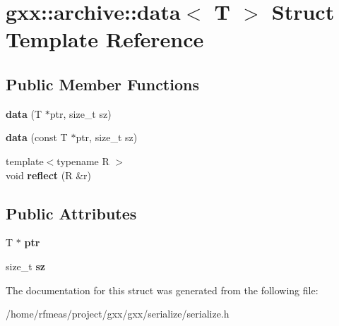 \hypertarget{structgxx_1_1archive_1_1data}{}\section{gxx\+:\+:archive\+:\+:data$<$ T $>$ Struct Template Reference}
\label{structgxx_1_1archive_1_1data}
\subsection*{Public Member Functions}
\begin{DoxyCompactItemize}
\item 
{\bfseries data} (T $\ast$ptr, size\+\_\+t sz)\hypertarget{structgxx_1_1archive_1_1data_a163daa780501b75f52e6176e3d31d91a}{}\label{structgxx_1_1archive_1_1data_a163daa780501b75f52e6176e3d31d91a}

\item 
{\bfseries data} (const T $\ast$ptr, size\+\_\+t sz)\hypertarget{structgxx_1_1archive_1_1data_afadb0f0c4a0cede76489736e64223eef}{}\label{structgxx_1_1archive_1_1data_afadb0f0c4a0cede76489736e64223eef}

\item 
{\footnotesize template$<$typename R $>$ }\\void {\bfseries reflect} (R \&r)\hypertarget{structgxx_1_1archive_1_1data_af2b0ea4292e6402c1cf71a153b4646be}{}\label{structgxx_1_1archive_1_1data_af2b0ea4292e6402c1cf71a153b4646be}

\end{DoxyCompactItemize}
\subsection*{Public Attributes}
\begin{DoxyCompactItemize}
\item 
T $\ast$ {\bfseries ptr}\hypertarget{structgxx_1_1archive_1_1data_a2767f28e6398ed082d401d9fa2cb1c76}{}\label{structgxx_1_1archive_1_1data_a2767f28e6398ed082d401d9fa2cb1c76}

\item 
size\+\_\+t {\bfseries sz}\hypertarget{structgxx_1_1archive_1_1data_a9e39cd96e4cd04ac5228460fa49cb2b5}{}\label{structgxx_1_1archive_1_1data_a9e39cd96e4cd04ac5228460fa49cb2b5}

\end{DoxyCompactItemize}


The documentation for this struct was generated from the following file\+:\begin{DoxyCompactItemize}
\item 
/home/rfmeas/project/gxx/gxx/serialize/serialize.\+h\end{DoxyCompactItemize}

